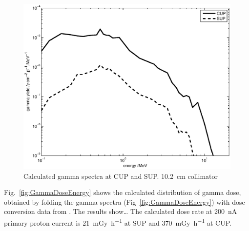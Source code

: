 \documentclass[11pt,a4paper]{IEEEtran}
\let\MYoriglatexcaption\caption
\renewcommand{\caption}[2][\relax]{\MYoriglatexcaption[#2]{#2}}
\begin{document}
\begin{figure}[t]
    \centering
    \includegraphics[width=0.9\columnwidth]{gDYieldcomparedRADECS.eps}
    \caption{
        Calculated gamma spectra at CUP and SUP.
        \SI{10.2}{\cm} collimator
    }
    \label{fig:DifferentialGammaSpectra}
\end{figure}

Fig.~\ref{fig:GammaDoseEnergy} shows the calculated distribution of gamma dose, obtained by folding the gamma spectra (Fig~\ref{fig:GammaDoseEnergy}) with dose conversion data from \cite{tbd}.
The results show\ldots
{}
The calculated dose rate at \SI{200}{\nA} primary proton current is \SI{21}{\milli\gray\per\hour} at SUP and \SI{370}{\milli\gray\per\hour} at CUP.
\end{document}
